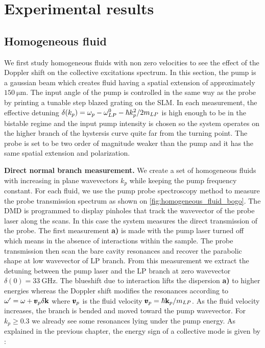 \section{Experimental results}

\subsection{Homogeneous fluid}

We first study homogeneous fluids with non zero velocities to see the effect of the Doppler shift on the collective excitations spectrum. In this section,
the pump is a gaussian beam which creates fluid having a spatial extension of approximately $150 \ \mathrm{\mu m}$. The input angle of the pump
is controlled in the same way as the probe by printing a tunable step blazed grating on the SLM. In each measurement, the effective detuning 
$\delta(k_p)=\omega_p -\omega_{LP}^0- \hbar k_p^2/2m_{LP}$ is high enough to be in the bistable regime and the input pump intensity is chosen so the system operates on the higher branch of the hystersis curve quite far from the turning point. 
The probe is set to be two order of magnitude weaker than the pump and it has the same spatial extension and polarization.

\bigskip

\textbf{Direct normal branch measurement.} We create a set of homogeneous fluids with increasing in plane wavevectors $k_p$ while keeping the pump frequency constant. 
For each fluid, we use the pump probe spectroscopy method to measure the probe transmission spectrum as shown on \autoref{fig:homogeneous_fluid_bogo}. 
The DMD is programmed to display pinholes that track the wavevector of the probe laser along the scans. In this case the system measures the direct transmission of the probe. The first measurement \textbf{a)} is made with the pump laser turned off which means in the absence of interactions within the sample.
The probe transmission then scan the bare cavity resonances and recover the parabolic shape at low wavevector of LP branch. From this measurement we extract the detuning between the pump laser and the LP branch at zero wavevector
 $\delta(0) = \SI{33}{\giga\hertz}$. 
 The blueshift due to interaction lifts the dispersion \textbf{a)} to higher energies whereas the Doppler shift modifies the resonances according to 
 $\omega' = \omega + \pmb{v}_p\delta \mathbf{k}$ where $\pmb{v}_p$ is the fluid velocity $\pmb{v}_p = \hbar \mathbf{k}_p/m_{LP}$.  As the fluid velocity increases, the branch is bended and moved toward the pump wavevector. 
 For $k_p\geq 0.3$ we already see some resonances lying under the pump energy. As explained in the previous chapter, the energy sign of a collective mode is given by :
 
